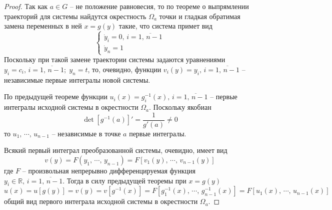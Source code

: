 \documentclass[a4paper,12pt]{article}
\theoremstyle{plain}
\theoremstyle{definition}
\theoremstyle{remark}
\begin{document}
\begin{proof}
	Так как $a \in G$ -- не положение равновесия, то по теореме о выпрямлении траекторий для системы найдутся окрестность $\Omega_a$ точки и гладкая обратимая замена переменных в ней $x = g(y)$ такие, что система примет вид
	\[\begin{cases}
			\dot{y}_i = 0,\, i = \overline{1,\,n-1} \\
			\dot{y}_n = 1
		\end{cases}\]
	Поскольку при такой замене траектории системы задаются уравнениями $y_i = c_i,\, i = \overline{1,\,n-1};\; y_n = t$, то, очевидно, функции $v_i(y) = y_i,\, i = \overline{1,\,n-1}$ -- независимые первые интегралы новой системы.

	По предыдущей теореме функции $u_i(x) = g^{-1}_i(x),\, i = \overline{1,\,n-1}$ -- первые интегралы исходной системы в окрестности $\Omega_a$. Поскольку якобиан
	\[\det[g^{-1}(a)]' = \frac{1}{g'(a)} \neq 0\]
	то $u_1,\,\cdots,\,u_{n-1}$ -- независимые в точке $a$ первые интегралы.

	Всякий первый интеграл преобразованной системы, очевидно, имеет вид
	\[v(y) = F(y_1,\,\cdots,\,y_{n-1}) = F[v_1(y),\,\cdots,\,v_{n-1}(y)]\]
	где $F$ -- произвольная непрерывно дифференцируемая функция $y_i \in \mathbb{R},\, i = \overline{1,\,n-1}$. Тогда в силу предыдущей теоремы при $x = g(y)$
	\[u(x) = u[g(y)] = v(y) = v[g^{-1}(x)] = F[g_1^{-1}(x),\,\cdots,\,g_{n-1}^{-1}(x)] = F[u_1(x),\,\cdots,\,u_{n-1}(x)]\]
	общий вид первого интеграла исходной системы в окрестности $\Omega_a$.
\end{proof}
\end{document}
